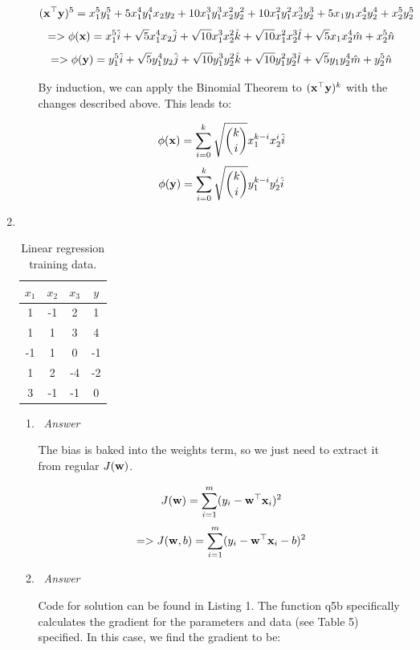 \documentclass[12pt, fullpage,letterpaper]{article}
\begin{document}
\begin{enumerate}
\begin{enumerate}
        \[
		    ({\bf x}^\top {\bf y})^5 = x_1^5y_1^5 + 5x_1^4y_1^4x_2y_2 + 10x_1^3y_1^3x_2^2y_2^2 + 10x_1^2y_1^2x_2^3y_2^3 + 5x_1y_1x_2^4y_2^4 + x_2^5y_2^5
		\]
		\[
            => \phi({\bf x}) = x_1^5\hat{i} + \sqrt{5}x_1^4x_2\hat{j} + \sqrt{10}x_1^3x_2^2\hat{k} + \sqrt{10}x_1^2x_2^3\hat{l} + \sqrt{5}x_1x_2^4\hat{m} + x_2^5\hat{n}
        \]
		\[
            => \phi({\bf y}) = y_1^5\hat{i} + \sqrt{5}y_1^4y_2\hat{j} + \sqrt{10}y_1^3y_2^2\hat{k} + \sqrt{10}y_1^2y_2^3\hat{l} + \sqrt{5}y_1y_2^4\hat{m} + y_2^5\hat{n}
        \]
        
        By induction, we can apply the Binomial Theorem to $({\bf x}^\top {\bf y})^k$ with the changes described above. This leads to:
        
        \[
            \phi({\bf x}) = \sum_{i=0}^k \sqrt{k \choose i} x_1^{k-i} x_2^{i} \hat{i}
        \]
        \[
            \phi({\bf y}) = \sum_{i=0}^k \sqrt{k \choose i} y_1^{k-i} y_2^{i} \hat{i}
        \]
		
	\end{enumerate}

\item~  
\begin{table}
	\centering
	\begin{tabular}{ccc|c}
		$x_1 $ & $x_2$ & $x_3$ &  $y$\\ 
		\hline\hline
		1 & -1 & 2 & 1 \\ \hline
		1 & 1 & 3 & 4 \\ \hline
		-1 & 1 & 0 & -1 \\ \hline
		1 & 2 & -4 & -2 \\ \hline
		3 & -1 & -1 & 0\\ \hline
	\end{tabular}
	\caption{Linear regression training data.}\label{tb:1}
\end{table}

\begin{enumerate}
	\item~\emph{Answer}
	
	The bias is baked into the weights term, so we just need to extract it from regular $J({\bf w})$.
	
	\[
	    J({\bf w}) = \sum_{i=1}^m (y_i - {\bf w}^\top {\bf x}_i)^2
	\]
	\[
	    => J({\bf w}, b) = \sum_{i=1}^m (y_i - {\bf w}^\top {\bf x}_i - b)^2
	\]
	
	\item~\emph{Answer}
	
	Code for solution can be found in Listing 1. The function q5b specifically calculates the gradient for the parameters and data (see Table 5) specified. In this case, we find the gradient to be:
	

\end{enumerate}
\end{enumerate}
\end{document}
